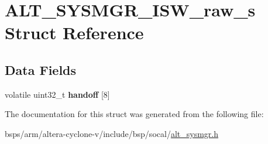 \hypertarget{structALT__SYSMGR__ISW__raw__s}{}\section{A\+L\+T\+\_\+\+S\+Y\+S\+M\+G\+R\+\_\+\+I\+S\+W\+\_\+raw\+\_\+s Struct Reference}
\label{structALT__SYSMGR__ISW__raw__s}
\subsection*{Data Fields}
\begin{DoxyCompactItemize}
\item 
\mbox{\label{structALT__SYSMGR__ISW__raw__s_a9e601dc4aa555fa0ab4dd7ce99b39fe9}} 
volatile uint32\+\_\+t {\bfseries handoff} \mbox{[}8\mbox{]}
\end{DoxyCompactItemize}


The documentation for this struct was generated from the following file\+:\begin{DoxyCompactItemize}
\item 
bsps/arm/altera-\/cyclone-\/v/include/bsp/socal/\mbox{\hyperlink{alt__sysmgr_8h}{alt\+\_\+sysmgr.\+h}}\end{DoxyCompactItemize}
